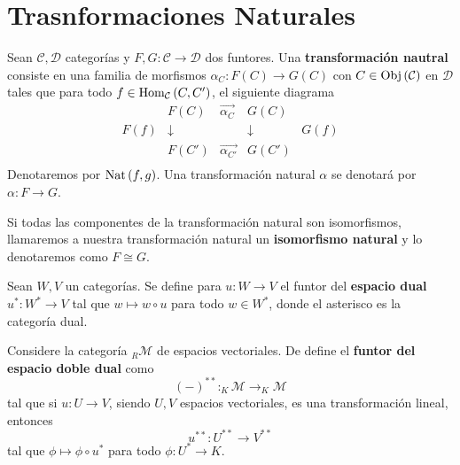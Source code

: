 \documentclass[12pt]{report}
\theoremstyle{largebreak}
\newcommand\cf[3]{\ensuremath{#1:#2\rightarrow#3}}
\newcommand{\Obj}[1]{\ensuremath{\textup{Obj}\left(#1\right)}}
\newcommand{\Hom}[3]{\ensuremath{\textup{Hom}_{#1}\left(#2,#3\right)}}
\begin{document}
    \chapter{Trasnformaciones Naturales}

    \newcommand{\Nat}[2]{\ensuremath{\textup{Nat}\left(#1,#2\right)}}

    \begin{mydef}
        Sean $\mathcal{C},\mathcal{D}$ categorías y $\cf{F,G}{\mathcal{C}}{\mathcal{D}}$ dos funtores. Una \textbf{transformación nautral} consiste en una familia de morfismos $\cf{\alpha_C}{F(C)}{G(C)}$ con $C\in\Obj{\mathcal{C}}$ en $\mathcal{D}$ tales que para todo $f\in\Hom{\mathcal{C}}{C}{C'}$, el siguiente diagrama
        \begin{equation*}
            \begin{array}{rcccl}
                &F(C) & \overset{\longrightarrow}{\alpha_C} & G(C) &\\
                F(f) & \downarrow & & \downarrow & G(f) \\
                &F(C') & \overset{\longrightarrow}{\alpha_{ C'}} & G(C') &\\
            \end{array}
        \end{equation*}
        Denotaremos por $\Nat{f}{g}$. Una transformación natural $\alpha$ se denotará por $\cf{\alpha}{F}{G}$.
    \end{mydef}

    \begin{obs}
        Si todas las componentes de la transformación natural son isomorfismos, llamaremos a nuestra transformación natural un \textbf{isomorfismo natural} y lo denotaremos como $F\cong G$.
    \end{obs}

    \begin{mydef}
        Sean $W,V$ un categorías. Se define para $\cf{u}{W}{V}$ el funtor del \textbf{espacio dual} $\cf{u^*}{W^*}{V}$ tal que $w\mapsto w\circ u$ para todo $w\in W^*$, donde el asterisco es la categoría dual.
    \end{mydef}

    \begin{mydef}
        Considere la categoría $_R\mathcal{M}$ de espacios vectoriales. De define el \textbf{funtor del espacio doble dual} como
        \begin{equation*}
            (-)^{ **}:_K\mathcal{M}\rightarrow _K\mathcal{M}
        \end{equation*}
        tal que si $\cf{u}{U}{V}$, siendo $U,V$ espacios vectoriales, es una transformación lineal, entonces
        \begin{equation*}
            u^{**}:U^{ **}\rightarrow V^{ **}
        \end{equation*}
        tal que $\phi\mapsto \phi\circ u^*$ para todo $\cf{\phi}{U^*}{K}$.
    \end{mydef}
\end{document}
